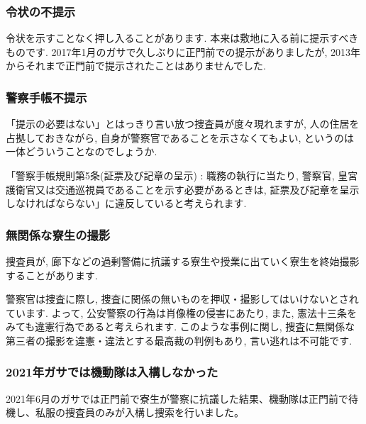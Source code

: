       
			\subsubsection{令状の不提示}
			令状を示すことなく押し入ることがあります. 本来は敷地に入る前に提示すべきものです. 2017年1月のガサで久しぶりに正門前での提示がありましたが, 2013年からそれまで正門前で提示されたことはありませんでした.

			\subsubsection{警察手帳不提示}
			「提示の必要はない」とはっきり言い放つ捜査員が度々現れますが, 人の住居を占拠しておきながら, 自身が警察官であることを示さなくてもよい, というのは一体どういうことなのでしょうか.

			「警察手帳規則第5条(証票及び記章の呈示) : 職務の執行に当たり, 警察官, 皇宮護衛官又は交通巡視員であることを示す必要があるときは, 証票及び記章を呈示しなければならない」に違反していると考えられます.

			\subsubsection{無関係な寮生の撮影}
			捜査員が, 廊下などの過剰警備に抗議する寮生や授業に出ていく寮生を終始撮影することがあります.

			警察官は捜査に際し, 捜査に関係の無いものを押収・撮影してはいけないとされています. よって, 公安警察の行為は肖像権の侵害にあたり, また, 憲法十三条をみても違憲行為であると考えられます. このような事例に関し, 捜査に無関係な第三者の撮影を違憲・違法とする最高裁の判例もあり, 言い逃れは不可能です.

			\subsubsection{2021年ガサでは機動隊は入構しなかった}
			2021年6月のガサでは正門前で寮生が警察に抗議した結果、機動隊は正門前で待機し、私服の捜査員のみが入構し捜索を行いました。
			